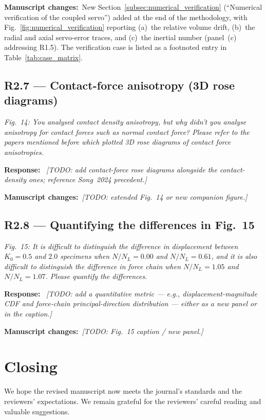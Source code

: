 \documentclass[11pt,a4paper]{article}
\newenvironment{rcomment}
  {\begin{leftbar}\color{black!75}\itshape}
  {\end{leftbar}\vspace{0.3em}}
\newcommand{\response}{\par\noindent\textbf{Response:}\ \ignorespaces}
\newcommand{\changed}[1]{\par\noindent\textbf{Manuscript changes:}\ #1\par}
\newcommand{\figref}[1]{Fig.~#1}
\newcommand{\Kzero}{\ensuremath{K_0}}
\begin{document}
\changed{New Section~\ref{subsec:numerical_verification}
(``Numerical verification of the coupled servo'') added at the end
of the methodology, with Fig.~\ref{fig:numerical_verification}
reporting (a)~the relative volume drift, (b)~the radial and axial
servo-error traces, and (c)~the inertial number (panel~(c)
addressing R1.5). The verification case is listed as a footnoted
entry in Table~\ref{tab:case_matrix}.}

\subsection*{R2.7 --- Contact-force anisotropy (3D rose diagrams)}

\begin{rcomment}
Fig.~14: You analysed contact density anisotropy, but why didn't you analyse
anisotropy for contact forces such as normal contact force? Please refer to
the papers mentioned before which plotted 3D rose diagrams of contact force
anisotropies.
\end{rcomment}

\response
\textit{[TODO: add contact-force rose diagrams alongside the contact-density
ones; reference Song~2024 precedent.]}

\changed{\textit{[TODO: extended \figref{14} or new companion figure.]}}

\subsection*{R2.8 --- Quantifying the differences in Fig.~15}

\begin{rcomment}
Fig.~15: It is difficult to distinguish the difference in displacement
between $\Kzero=0.5$ and $2.0$ specimens when $N/N_L=0.00$ and $N/N_L=0.61$,
and it is also difficult to distinguish the difference in force chain when
$N/N_L=1.05$ and $N/N_L=1.07$. Please quantify the differences.
\end{rcomment}

\response
\textit{[TODO: add a quantitative metric --- e.g., displacement-magnitude
CDF and force-chain principal-direction distribution --- either as a new
panel or in the caption.]}

\changed{\textit{[TODO: \figref{15} caption / new panel.]}}

\clearpage

\section*{Closing}

We hope the revised manuscript now meets the journal's standards and the
reviewers' expectations. We remain grateful for the reviewers' careful
reading and valuable suggestions.



\end{document}
